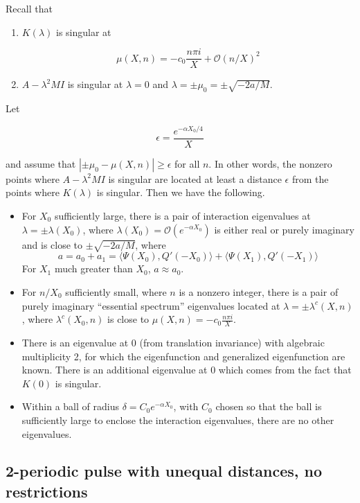 \documentclass[12pt]{article}
\begin{document}
Recall that 

\begin{enumerate}
\item $K(\lambda)$ is singular at

\[
\mu(X, n) = -c_0 \frac{n \pi i}{X} + \mathcal{O}(n/X)^2
\]

\item $A - \lambda^2 M I$ is singular at $\lambda = 0$ and $\lambda = \pm \mu_0 = \pm \sqrt{-2a/M}$. 

\end{enumerate}

Let 

\[
\epsilon = \frac{e^{-\alpha X_0/4}}{X}
\]

and assume that $| \pm \mu_0 - \mu(X, n)| \geq \epsilon$ for all $n$. In other words, the nonzero points where $A - \lambda^2 M I$ is singular are located at least a distance $\epsilon$ from the points where $K(\lambda)$ is singular. Then we have the following.

\begin{itemize}
	\item For $X_0$ sufficiently large, there is a pair of interaction eigenvalues at $\lambda = \pm \lambda(X_0)$, where $\lambda(X_0) = \mathcal{O}(e^{-\alpha X_0})$ is either real or purely imaginary and is close to $\pm \sqrt{-2a/M}$, where 
	\[
	a = a_0 + a_1 = \langle \Psi(X_0), Q'(-X_0) \rangle + \langle \Psi(X_1), Q'(-X_1) \rangle
	\]
	For $X_1$ much greater than $X_0$, $a \approx a_0$.
	\item For $n/X_0$ sufficiently small, where $n$ is a nonzero integer, there is a pair of purely imaginary ``essential spectrum'' eigenvalues located at $\lambda = \pm \lambda^c(X, n)$, where $\lambda^c(X_0, n)$ is close to $\mu(X, n) = -c_0 \frac{n \pi i }{X}$.
	\item There is an eigenvalue at 0 (from translation invariance) with algebraic multiplicity 2, for which the eigenfunction and generalized eigenfunction are known. There is an additional eigenvalue at 0 which comes from the fact that $K(0)$ is singular.
	\item Within a ball of radius $\delta = C_0 e^{-\alpha X_0}$, with $C_0$ chosen so that  the ball is sufficiently large to enclose the interaction eigenvalues, there are no other eigenvalues.
\end{itemize}

\subsection{2-periodic pulse with unequal distances, no restrictions}
\end{document}

